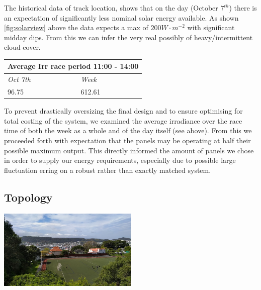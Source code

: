 \documentclass[11pt]{article}
\begin{document}
The historical data of track location, shows that on the day (October $7^{th}$) there is an expectation of significantly less nominal solar energy available. As shown \ref{fig:solarview} above the data expects a max of $200 W{\cdot}m^{-2}$ with significant midday dips. From this we can infer the very real possibly of heavy/intermittent cloud cover.

\begin{table}[h!]
    \begin{center}
        \begin{tabular}{|l|l|}
            \hline
            \multicolumn{2}{|c|}{\textbf{Average Irr race period 11:00 - 14:00}} \\ \hline
            \textit{Oct 7th}                   & \textit{Week}                   \\ \hline
            96.75                              & 612.61                          \\ \hline
        \end{tabular}
    \end{center}
\end{table}

To prevent drastically oversizing the final design and to ensure optimising for total costing of the system, we examined the average irradiance over the race time of both the week as a whole and of the day itself (see above). From this we proceeded forth with expectation that the panels may be operating at half their possible maximum output. This directly informed the amount of panels we chose in order to supply our energy requirements, especially due to possible large fluctuation erring on a robust rather than exactly matched system.

\subsection{Topology}

\begin{center}
    \includegraphics[width=0.5\textwidth]{inc/IMG20201006120746.jpg}
\end{center}
\end{document}
